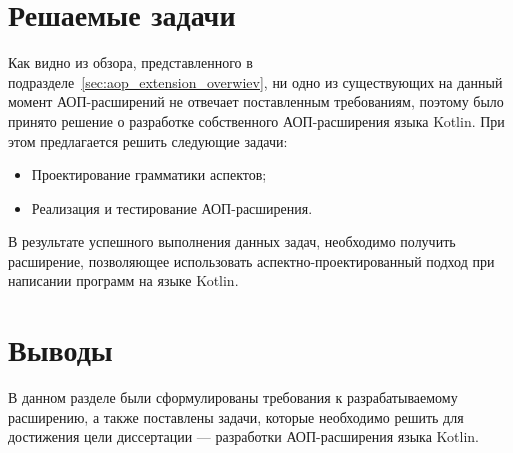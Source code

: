 \section{Решаемые задачи}
\label{sec:tasks}
Как видно из обзора, представленного в подразделе~\ref{sec:aop_extension_overwiev}, ни одно из существующих на данный момент АОП-расширений не отвечает поставленным требованиям, поэтому было принято решение о разработке собственного АОП-расширения языка Kotlin.
При этом предлагается решить следующие задачи:
\begin{itemize}
    \item Проектирование грамматики аспектов;
    \item Реализация и тестирование АОП-расширения.
\end{itemize}

В результате успешного выполнения данных задач, необходимо получить расширение, позволяющее использовать аспектно-проектированный подход при написании программ на языке Kotlin.
\section{Выводы}
В данном разделе были сформулированы требования к разрабатываемому расширению, а также поставлены задачи, которые необходимо решить для достижения цели диссертации --- разработки АОП-расширения языка Kotlin.